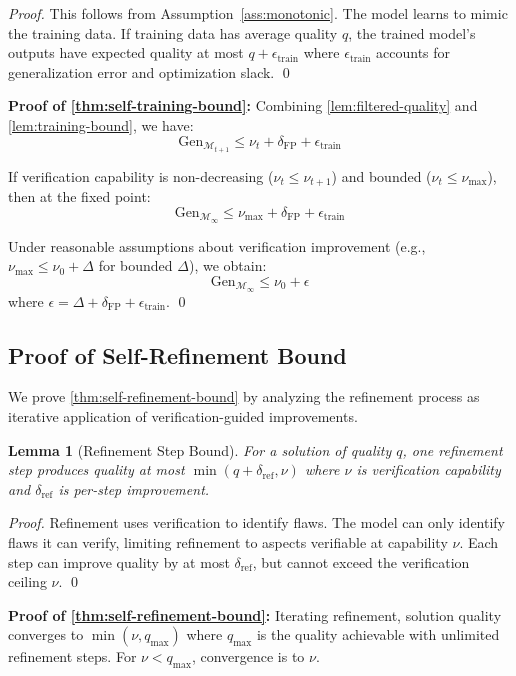 \documentclass{article}
\newtheorem{lemma}[theorem]{Lemma}
\theoremstyle{definition}
\theoremstyle{remark}
\newcommand{\M}{\mathcal{M}}  %
\newcommand{\Gen}{\text{Gen}}  %
\begin{document}
\begin{proof}
This follows from Assumption~\ref{ass:monotonic}. The model learns to mimic the training data. If training data has average quality \(q\), the trained model's outputs have expected quality at most \(q + \epsilon_{\text{train}}\) where \(\epsilon_{\text{train}}\) accounts for generalization error and optimization slack. \qed
\end{proof}

\noindent\textbf{Proof of \cref{thm:self-training-bound}:}
Combining \cref{lem:filtered-quality} and \cref{lem:training-bound}, we have:
\[
\Gen_{\M_{t+1}} \leq \nu_t + \delta_{\text{FP}} + \epsilon_{\text{train}}
\]

If verification capability is non-decreasing (\(\nu_t \leq \nu_{t+1}\)) and bounded (\(\nu_t \leq \nu_{\max}\)), then at the fixed point:
\[
\Gen_{\M_\infty} \leq \nu_{\max} + \delta_{\text{FP}} + \epsilon_{\text{train}}
\]

Under reasonable assumptions about verification improvement (e.g., \(\nu_{\max} \leq \nu_0 + \Delta\) for bounded \(\Delta\)), we obtain:
\[
\Gen_{\M_\infty} \leq \nu_0 + \epsilon
\]
where \(\epsilon = \Delta + \delta_{\text{FP}} + \epsilon_{\text{train}}\). \qed

\subsection{Proof of Self-Refinement Bound}
\label{app:proof-sr-bound}

We prove \cref{thm:self-refinement-bound} by analyzing the refinement process as iterative application of verification-guided improvements.

\begin{lemma}[Refinement Step Bound]
\label{lem:refinement-step}
For a solution of quality \(q\), one refinement step produces quality at most \(\min(q + \delta_{\text{ref}}, \nu)\) where \(\nu\) is verification capability and \(\delta_{\text{ref}}\) is per-step improvement.
\end{lemma}

\begin{proof}
Refinement uses verification to identify flaws. The model can only identify flaws it can verify, limiting refinement to aspects verifiable at capability \(\nu\). Each step can improve quality by at most \(\delta_{\text{ref}}\), but cannot exceed the verification ceiling \(\nu\). \qed
\end{proof}

\noindent\textbf{Proof of \cref{thm:self-refinement-bound}:}
Iterating refinement, solution quality converges to \(\min(\nu, q_{\max})\) where \(q_{\max}\) is the quality achievable with unlimited refinement steps. For \(\nu < q_{\max}\), convergence is to \(\nu\).
\end{document}
